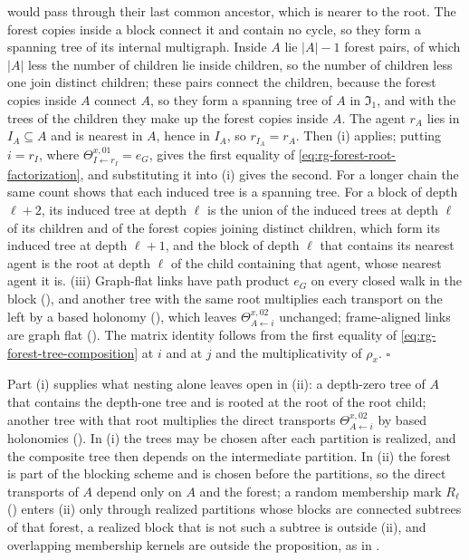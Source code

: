 would pass through their last common ancestor, which is nearer to the root. The forest copies inside a block
connect it and contain no cycle, so they form a spanning tree of its internal multigraph. Inside $A$ lie
$\lvert A\rvert-1$ forest pairs, of which $\lvert A\rvert$ less the number of children lie inside children,
so the number of children less one join distinct children; these pairs connect the children,
because the forest copies inside $A$ connect $A$, so they form a spanning tree of $A$ in $\mathfrak I_1$, and
with the trees of the children they make up the forest copies inside $A$. The agent $r_A$ lies in
$I_A\subseteq A$ and is nearest in $A$, hence in $I_A$, so $r_{I_A}=r_A$. Then (i) applies; putting $i=r_I$,
where $\Theta^{x,01}_{I\leftarrow r_I}=e_G$, gives the first equality of
\eqref{eq:rg-forest-root-factorization}, and substituting it into (i) gives the second. For a longer chain the
same count shows that each induced tree is a spanning tree. For a block of depth $\ell+2$, its induced tree at
depth $\ell$ is the union of the induced trees at depth $\ell$ of its children and of the forest copies
joining distinct children, which form its induced tree at depth $\ell+1$, and the block of depth $\ell$ that
contains its nearest agent is the root at depth $\ell$ of the child containing that agent, whose nearest agent
it is. (iii) Graph-flat links have path product $e_G$ on every closed walk in the block
(), and another tree with the same root multiplies each transport on
the left by a based holonomy (), which leaves $\Theta^{x,02}_{A\leftarrow i}$
unchanged; frame-aligned links are graph flat (). The matrix identity
follows from the first equality of \eqref{eq:rg-forest-tree-composition} at $i$ and at $j$ and the
multiplicativity of $\rho_x$. $\square$

Part (i) supplies what nesting alone leaves open in (ii): a depth-zero
tree of $A$ that contains the depth-one tree and is rooted at the root of the root child; another tree with
that root multiplies the direct transports $\Theta^{x,02}_{A\leftarrow i}$ by based holonomies
(). In (i) the trees may be chosen after each partition is realized, and the
composite tree then depends on the intermediate partition. In (ii) the forest is part of the blocking scheme
and is chosen before the partitions, so the direct transports of $A$ depend only on $A$ and the forest; a
random membership mark $R_\ell$ () enters (ii) only through realized
partitions whose blocks are connected subtrees of that forest, a realized block that is not such a subtree
is outside (ii), and overlapping membership kernels are outside the proposition, as in
.

